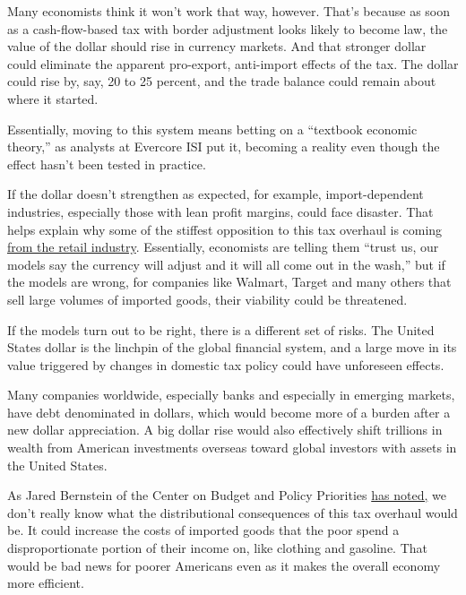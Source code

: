 Many economists think it won't work that way, however. That's because as
soon as a cash-flow-based tax with border adjustment looks likely to
become law, the value of the dollar should rise in currency markets. And
that stronger dollar could eliminate the apparent pro-export,
anti-import effects of the tax. The dollar could rise by, say, 20 to 25
percent, and the trade balance could remain about where it started.

Essentially, moving to this system means betting on a ``textbook
economic theory,'' as analysts at Evercore ISI put it, becoming a
reality even though the effect hasn't been tested in practice.

If the dollar doesn't strengthen as expected, for example,
import-dependent industries, especially those with lean profit margins,
could face disaster. That helps explain why some of the stiffest
opposition to this tax overhaul is coming
\href{http://www.politico.com/story/2016/11/retailers-fear-massive-tax-increases-under-house-republicans-tax-plan-231817}{from
the retail industry}. Essentially, economists are telling them ``trust
us, our models say the currency will adjust and it will all come out in
the wash,'' but if the models are wrong, for companies like Walmart,
Target and many others that sell large volumes of imported goods, their
viability could be threatened.

If the models turn out to be right, there is a different set of risks.
The United States dollar is the linchpin of the global financial system,
and a large move in its value triggered by changes in domestic tax
policy could have unforeseen effects.

Many companies worldwide, especially banks and especially in emerging
markets, have debt denominated in dollars, which would become more of a
burden after a new dollar appreciation. A big dollar rise would also
effectively shift trillions in wealth from American investments overseas
toward global investors with assets in the United States.

As Jared Bernstein of the Center on Budget and Policy Priorities
\href{https://www.washingtonpost.com/posteverything/wp/2016/12/30/my-take-on-the-republicans-new-interesting-corporate-tax-plan/?utm_term=.d7e54ba12abe}{has
noted,} we don't really know what the distributional consequences of
this tax overhaul would be. It could increase the costs of imported
goods that the poor spend a disproportionate portion of their income on,
like clothing and gasoline. That would be bad news for poorer Americans
even as it makes the overall economy more efficient.

